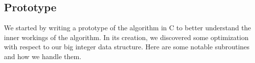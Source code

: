 

\subsection{Prototype}
We started by writing a prototype of the algorithm in C to better understand the
inner workings of the algorithm. In its creation, we discovered some
optimization with respect to our big integer data structure. Here are some
notable subroutines and how we handle them.


